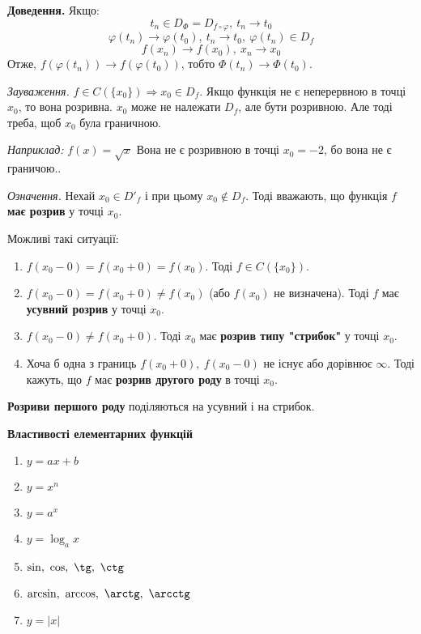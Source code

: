 \documentclass[12pt]{report}
\begin{document}
\textbf{Доведення.} Якщо:
$$t_n \in D_{\Phi}  = D_{f \circ \varphi},\ t_n \to t_0$$
$$\varphi(t_n) \to \varphi(t_0),\ t_n \to t_0,\ \varphi(t_n) \in D_f$$
$$f(x_n) \to f(x_0),\ x_n \to x_0$$
Отже, $f(\varphi(t_n)) \to f(\varphi(t_0))$, тобто $\Phi(t_n) \to \Phi(t_0)$.

\vspace{5mm}

\textit{Зауваження.} $f \in C(\{ x_0\}) \Longrightarrow x_0 \in D_f$. Якщо функція не є неперервною в точці $x_0$, то вона розривна. $x_0$ може не належати $D_f$, але бути розривною. Але тоді треба, щоб $x_0$ була граничною.

\textit{Наприклад:} $f(x) = \sqrt{x}$ Вона не є розривною в точці $x_0= -2$, бо вона не є граничою.. 

\textit{Означення.} Нехай $x_0 \in D'_f$ і при цьому $x_0 \notin D_f$. Тоді вважають, що функція $f$ \textbf{має розрив} у точці $x_0$.

Можливі такі ситуації:
\begin{enumerate}
    \item $f(x_0 - 0) = f(x_0 + 0) = f(x_0)$. Тоді $f \in C(\{ x_0\})$.
    \item $f(x_0 - 0) = f(x_0 + 0) \neq f(x_0)$ (або $f(x_0)$ не визначена). Тоді $f$ має \textbf{усувний розрив} у точці $x_0$.
    \item $f(x_0-0) \neq f(x_0+0)$. Тоді $x_0$ має \textbf{розрив типу "стрибок"} у точці $x_0$.
    \item Хоча б одна з границь $f(x_0 + 0),\ f(x_0 - 0)$ не існує або дорівнює $\infty$. Тоді кажуть, що $f$ має \textbf{розрив другого роду} в точці $x_0$.
\end{enumerate}
\textbf{Розриви першого роду} поділяються на усувний і на стрибок.

\begin{center}
    \textbf{\large Властивості елементарних функцій}
\end{center}

\begin{enumerate}
    \item $y = ax + b$
    \item $y = x^n$
    \item $y = a^x$
    \item $y = \log_{a}x$
    \item $\sin,\ \cos,\ \tg,\ \ctg$
    \item $\arcsin,\ \arccos,\ \arctg,\ \arcctg$    
    \item $y = |x|$
\end{enumerate}
\end{document}
